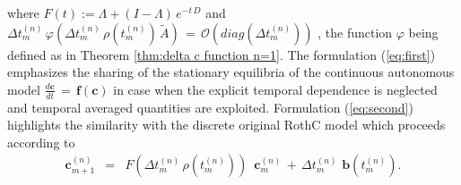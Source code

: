 where $F(t):= \Lambda + (I-\Lambda)\, e^{-t\, D}$ and $\Delta t^{(n)}_m \,\varphi(\Delta t^{(n)}_m\,\rho(t^{(n)}_{m})\, \widetilde A )\, =\,   \mathcal{O}(diag(\Delta t^{(n)}_m))$ \cite{diele2021non}, the function $\varphi$ being defined as in Theorem \ref{thm:delta c function n=1}. The formulation (\ref{eq:first}) emphasizes the sharing of the stationary equilibria of the continuous autonomous model $ \displaystyle \frac{d \mathbf{c}}{dt}\, =\,  \mathbf{f} (\mathbf{c})$  in case when the explicit temporal dependence is neglected and  temporal averaged quantities are exploited. Formulation (\ref{eq:second})   highlights the similarity with the discrete original RothC model which proceeds according to 
\begin{equation}\label{eq:RothCdiscreto}
 \begin{array}{lll}
 \mathbf{c}^{(n)}_{m+1} &=& F(\Delta t^{(n)}_m\,\rho(t^{(n)}_{m}))\,\,\, \mathbf{c}^{(n)}_m \,+\, \Delta t^{(n)}_m \,\, \mathbf{b}(t^{(n)}_{m}).
 \end{array}
\end{equation}

